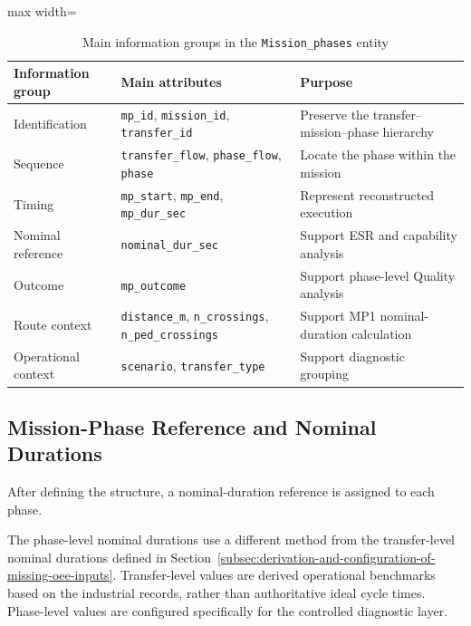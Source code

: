 \begin{table}[htbp]
\small
\renewcommand{\arraystretch}{1.3}
\centering
\caption{Main information groups in the \texttt{Mission\_phases} entity}
\label{tab:mission-phases-information-groups}
\begin{adjustbox}{max width=\textwidth}
\begin{tabular}{|p{3.3cm}|p{5.6cm}|p{5.1cm}|}
\hline
\textbf{Information group} & \textbf{Main attributes} & \textbf{Purpose} \\
\hline
Identification & \texttt{mp\_id}, \texttt{mission\_id}, \texttt{transfer\_id} & Preserve the transfer--mission--phase hierarchy \\
\hline
Sequence & \texttt{transfer\_flow}, \texttt{phase\_flow}, \texttt{phase} & Locate the phase within the mission \\
\hline
Timing & \texttt{mp\_start}, \texttt{mp\_end}, \texttt{mp\_dur\_sec} & Represent reconstructed execution \\
\hline
Nominal reference & \texttt{nominal\_dur\_sec} & Support ESR and capability analysis \\
\hline
Outcome & \texttt{mp\_outcome} & Support phase-level Quality analysis \\
\hline
Route context & \texttt{distance\_m}, \texttt{n\_crossings}, \texttt{n\_ped\_crossings} & Support MP1 nominal-duration calculation \\
\hline
Operational context & \texttt{scenario}, \texttt{transfer\_type} & Support diagnostic grouping \\
\hline
\end{tabular}
\end{adjustbox}
\end{table}

\subsection{Mission-Phase Reference and Nominal Durations}
\label{subsec:mission-phase-reference-and-nominal-durations}
After defining the structure, a nominal-duration reference is assigned to each phase.

The phase-level nominal durations use a different method from the transfer-level nominal durations defined in Section~\ref{subsec:derivation-and-configuration-of-missing-oee-inputs}. Transfer-level values are derived operational benchmarks based on the industrial records, rather than authoritative ideal cycle times. Phase-level values are configured specifically for the controlled diagnostic layer.

